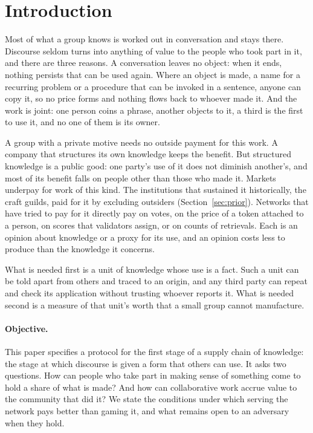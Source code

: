 \section{Introduction}\label{sec:intro}

Most of what a group knows is worked out in conversation and stays there. Discourse seldom turns into anything of
value to the people who took part in it, and there are three reasons. A conversation leaves no object: when it ends,
nothing persists that can be used again. Where an object is made, a name for a recurring problem or a procedure
that can be invoked in a sentence, anyone can copy it, so no price forms and nothing flows back to whoever made
it. And the work is joint: one person coins a phrase, another objects to it, a third is the first to use it, and
no one of them is its owner.

A group with a private motive needs no outside payment for this work. A company that structures its own knowledge
keeps the benefit. But structured knowledge is a public good: one party's use of it does not diminish another's,
and most of its benefit falls on people other than those who made it. Markets underpay for work of this kind. The
institutions that sustained it historically, the craft guilds, paid for it by excluding outsiders
(Section~\ref{sec:prior}). Networks that have tried to pay for it directly pay on votes, on the price of a token
attached to a person, on scores that validators assign, or on counts of retrievals. Each is an opinion about
knowledge or a proxy for its use, and an opinion costs less to produce than the knowledge it concerns.

What is needed first is a unit of knowledge whose use is a fact. Such a unit can be told apart from others and
traced to an origin, and any third party can repeat and check its application without trusting whoever reports it.
What is needed second is a measure of that unit's worth that a small group cannot manufacture.

\paragraph{Objective.} This paper specifies a protocol for the first stage of a supply chain of knowledge: the
stage at which discourse is given a form that others can use. It asks two questions. How can people who take part
in making sense of something come to hold a share of what is made? And how can collaborative work accrue value to
the community that did it? We state the conditions under which serving the network pays better than gaming it, and
what remains open to an adversary when they hold.

